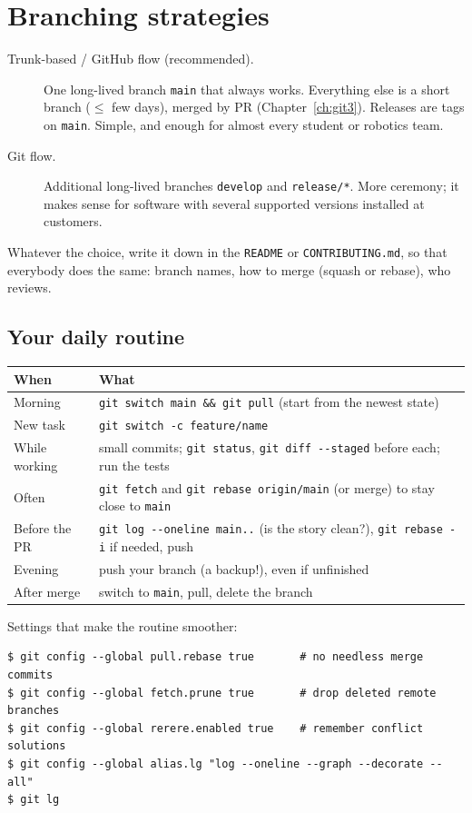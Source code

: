 \section*{Branching strategies}
\begin{description}
  \item[Trunk-based / GitHub flow (recommended).] One long-lived branch \texttt{main} that always works. Everything else is a short branch ($\leq$ few days), merged by PR (Chapter~\ref{ch:git3}). Releases are tags on \texttt{main}. Simple, and enough for almost every student or robotics team.
  \item[Git flow.] Additional long-lived branches \texttt{develop} and \texttt{release/*}. More ceremony; it makes sense for software with several supported versions installed at customers.
\end{description}
Whatever the choice, write it down in the \texttt{README} or \texttt{CONTRIBUTING.md}, so that everybody does the same: branch names, how to merge (squash or rebase), who reviews.

\subsection*{Your daily routine}
\begin{center}
\renewcommand{\arraystretch}{1.25}
\begin{tabular}{p{2.6cm}p{10.4cm}}
\textbf{When} & \textbf{What}\\ \hline
Morning & \verb!git switch main && git pull! (start from the newest state)\\
New task & \verb!git switch -c feature/name!\\
While working & small commits; \verb!git status!, \verb!git diff --staged! before each; run the tests\\
Often & \verb!git fetch! and \verb!git rebase origin/main! (or merge) to stay close to \texttt{main}\\
Before the PR & \verb!git log --oneline main..! (is the story clean?), \verb!git rebase -i! if needed, push\\
Evening & push your branch (a backup!), even if unfinished\\
After merge & switch to \texttt{main}, pull, delete the branch\\
\end{tabular}
\end{center}
Settings that make the routine smoother:
\begin{verbatim}
$ git config --global pull.rebase true       # no needless merge commits
$ git config --global fetch.prune true       # drop deleted remote branches
$ git config --global rerere.enabled true    # remember conflict solutions
$ git config --global alias.lg "log --oneline --graph --decorate --all"
$ git lg
\end{verbatim}

